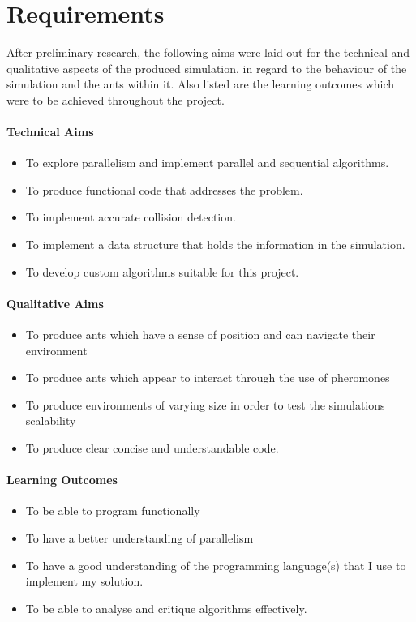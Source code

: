 \documentclass[main.tex]{subfiles}
\begin{document}
\section{Requirements}
After preliminary research, the following aims were laid out for the technical and qualitative aspects of the produced simulation, in regard to the behaviour of the simulation and the ants within it. Also listed are the learning outcomes which were to be achieved throughout the project.

\paragraph{Technical Aims}
\begin{itemize}
	\item To explore parallelism and implement parallel and sequential algorithms.
	\item To produce functional code that addresses the problem.
	\item To implement accurate collision detection.
	\item To implement a data structure that holds the information in the simulation.
	\item To develop custom algorithms suitable for this project.
\end{itemize}

\paragraph{Qualitative Aims}
\begin{itemize}
	\item To produce ants which have a sense of  position and can navigate their environment
	\item To produce ants which appear to interact through the use of pheromones
	\item To produce environments of varying size in order to test the simulations scalability
	\item To produce clear concise and understandable code.
\end{itemize}

\paragraph{Learning Outcomes}
\begin{itemize}
	\item To be able to program functionally
	\item To have a better understanding of parallelism
	\item To have a good understanding of the programming language(s) that I use to implement my solution.
	\item To be able to analyse and critique algorithms effectively.
\end{itemize}
\end{document}
